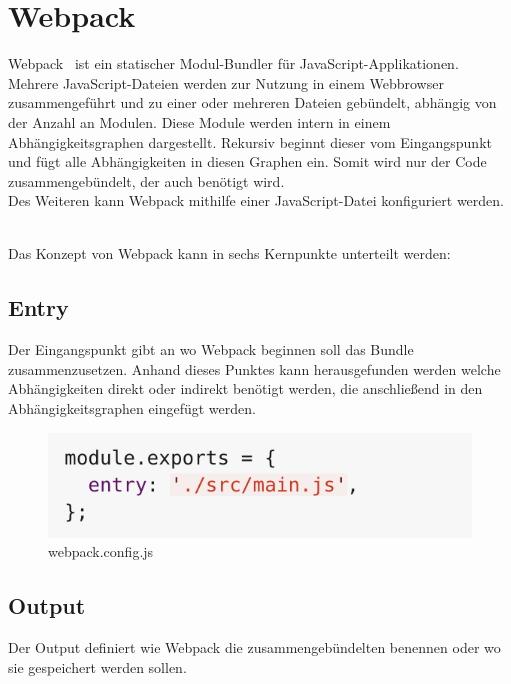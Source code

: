 \section{Webpack}
Webpack~\cite{webpack_2021} ist ein statischer Modul-Bundler für JavaScript-Applikationen. Mehrere JavaScript-Dateien werden zur Nutzung in einem Webbrowser zusammengeführt und zu einer oder mehreren Dateien gebündelt, abhängig von der Anzahl an Modulen. Diese Module werden intern in einem Abhängigkeitsgraphen dargestellt. Rekursiv beginnt dieser vom Eingangspunkt und fügt alle Abhängigkeiten in diesen Graphen ein. Somit wird nur der Code zusammengebündelt, der auch benötigt wird. \\
Des Weiteren kann Webpack mithilfe einer JavaScript-Datei konfiguriert werden.

\mbox{}\\
Das Konzept von Webpack kann in sechs Kernpunkte unterteilt werden:

\subsection{Entry}
Der Eingangspunkt gibt an wo Webpack beginnen soll das Bundle zusammenzusetzen. Anhand dieses Punktes kann herausgefunden werden welche Abhängigkeiten direkt oder indirekt benötigt werden, die anschließend in den Abhängigkeitsgraphen eingefügt werden. 

\begin{figure}[H]
	\begin{center}
		\includegraphics[scale=.7]{images/webpack-entry-point.png}
	\end{center}
		\caption{webpack.config.js}
\end{figure}

\subsection{Output}
Der Output definiert wie Webpack die zusammengebündelten benennen oder wo sie gespeichert werden sollen. 

